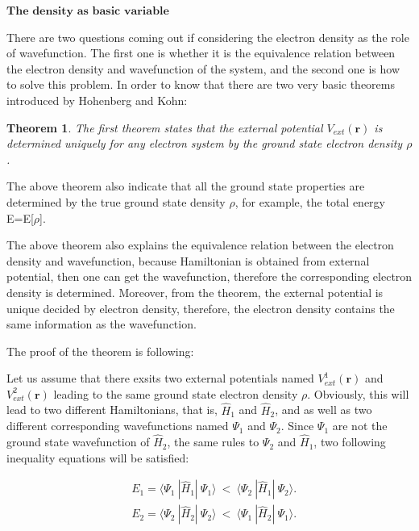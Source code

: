 \documentclass[a4paper, 12pt, titlepage,oneside,drop]{kthesis}
\newtheorem{thm}{Theorem}
\begin{document}
$\textbf{The density as basic variable}$ 

There are two questions coming out if considering the electron density as the role of wavefunction. The first one is whether it
 is the equivalence relation between the electron density and wavefunction of the system, and the second one is how to solve this 
problem. In order to know that there are two very basic theorems introduced by Hohenberg and Kohn:

\begin{thm}
\label{hk1}
\noindent The first theorem states that the external potential $V_\textit{ext}(\textbf{r})$  is determined uniquely for any electron system by the ground state electron density $\rho$.
\end{thm}

The above theorem also indicate that all the ground state properties are determined by the true ground state density $\rho$,
for example, the total energy E=E[$\rho$]. 

The above theorem also explains the equivalence relation between the electron density and wavefunction, because Hamiltonian is obtained from external potential,
then one can get the wavefunction, therefore the corresponding electron density is determined. Moreover, from the theorem, the external potential is unique decided by electron
density, therefore, the electron density contains the same information as the wavefunction.

The proof of the theorem is following:

Let us assume that there exsits two external potentials named $V^{1}_\textit{ext}(\textbf{r})$ and $V^{2}_\textit{ext}(\textbf{r})$ leading to the same ground state 
electron density $\rho$. Obviously, this will lead to two different Hamiltonians, that is, $\hat{H}_{1}$ and $\hat{H}_{2}$, and as well as two different corresponding
wavefunctions named $\Psi_1$ and $\Psi_2$. Since $\Psi_1$ are not the ground state wavefunction of $\hat{H}_{2}$, the same rules to $\Psi_2$ and $\hat{H}_{1}$, two following
inequality equations will be satisfied:

\begin{equation}\label{hkpf1}\begin{split}
&  E_1 = \langle \Psi_1\ |\hat{H}_{1}|\ \Psi_1 \rangle  \ < \  \langle \Psi_2\ |\hat{H}_{1}|\ \Psi_2 \rangle.\\
&  E_2 = \langle \Psi_2\ |\hat{H}_{2}|\ \Psi_2 \rangle  \ < \  \langle \Psi_1\ |\hat{H}_{2}|\ \Psi_1 \rangle.
\end{split}\end{equation}
\end{document}
